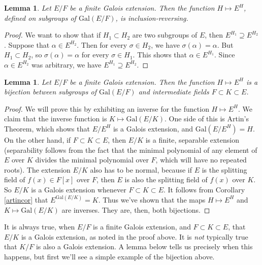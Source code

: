 \documentclass[12pt]{report}
\newtheorem{lemma}[thm]{Lemma}
\theoremstyle{definition}
\def\aa{\alpha}
\def\Gal{\text{Gal}}
\begin{document}
\begin{lemma}
    Let $E/F$ be a finite Galois extension. Then the function $H \mapsto E^H$, defined on subgroups of $\Gal(E/F)$, is inclusion-reversing.
\end{lemma}

\begin{proof}
    We want to show that if $H_1 \subset H_2$ are two subgroups of $E$, then $E^{H_1}\supseteq E^{H_2}$. Suppose that $\aa\in E^{H_2}$. Then for every $\sigma\in H_2$, we have $\sigma(\aa) = \aa$. But $H_1 \subset  H_2$, so $\sigma(\aa) = \aa$ for every $\sigma\in H_1$. This shows that $\aa\in E^{H_1}$. Since $\aa\in E^{H_2}$ was arbitrary, we have $E^{H_1}\supseteq E^{H_2}$.
\end{proof}

\begin{lemma}
    Let $E/F$ be a finite Galois extension. Then the function $H \mapsto E^H$ is a bijection between subgroups of $\Gal(E/F)$ and intermediate fields $F \subset  K \subset  E$.
\end{lemma}

\begin{proof}
    We will prove this by exhibiting an inverse for the function $H \mapsto E^H$. We claim that the inverse function is $K \mapsto \Gal(E/K)$. One side of this is Artin's Theorem, which shows that $E/E^H$ is a Galois extension, and $\Gal(E/E^H) = H$. On the other hand, if $F \subset  K \subset  E$, then $E/K$ is a finite, separable extension (separability follows from the fact that the minimal polynomial of any element of $E$ over $K$ divides the minimal polynomial over $F$, which will have no repeated roots). The extension $E/K$ also has to be normal, because if $E$ is the splitting field of $f(x)\in F[x]$ over $F$, then $E$ is also the splitting field of $f(x)$ over $K$. So $E/K$ is a Galois extension whenever $F \subset  K \subset  E$. It follows from Corollary \ref{artincor} that $E^{\Gal(E/K)} = K$. Thus we've shown that the maps $H \mapsto E^H$ and $K \mapsto \Gal(E/K)$ are inverses. They are, then, both bijections.
\end{proof}


It is always true, when $E/F$ is a finite Galois extension, and $F \subset  K \subset  E$, that $E/K$ is a Galois extension, as noted in the proof above. It is \emph{not} typically true that $K/F$ is also a Galois extension. A lemma below tells us precisely when this happens, but first we'll see a simple example of the bijection above.
\end{document}
